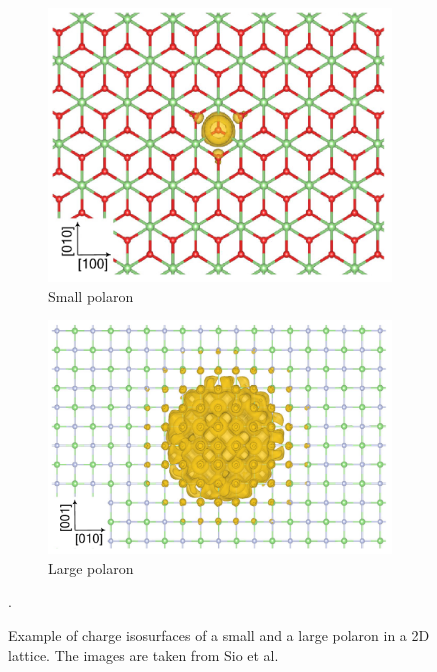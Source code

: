 \begin{figure}
    \begin{subfigure}{0.45\textwidth}
        \centering
        \includegraphics[height=0.73\textwidth]{figures/small.png}
        \caption{Small polaron}
        \label{fig:small}
    \end{subfigure}
    \hfill
    \begin{subfigure}{0.45\textwidth}
        \centering
        \includegraphics[height=0.73\textwidth]{figures/large.png}
        \caption{Large polaron}
        \label{fig:large}
    \end{subfigure}
    \caption{Example of charge isosurfaces of a small and a large polaron in a 2D lattice. The images are taken from Sio et al. \cite{sio2019}}.
    \label{fig:small_large}
\end{figure}

